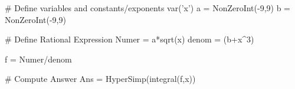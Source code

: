 \begin{sagesilent}
# Define variables and constants/exponents
var('x')
a = NonZeroInt(-9,9)
b = NonZeroInt(-9,9)

# Define Rational Expression
Numer = a*sqrt(x)
denom = (b+x^3)

f = Numer/denom

# Compute Answer
Ans = HyperSimp(integral(f,x))
\end{sagesilent}


%
%
%
%
%
%
%
%



